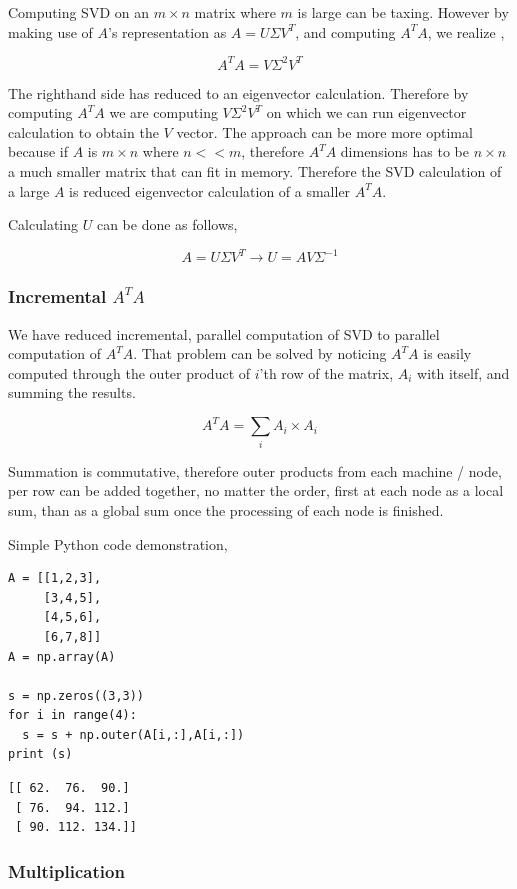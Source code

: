 \documentclass{article}
\begin{document}
Computing SVD on an $m \times n$ matrix where $m$ is large can be
taxing. However by making use of $A$'s representation as $A = U \Sigma V^T$, and
computing $A^TA$, we realize \cite{zadeh},

$$
A^TA = V \Sigma^2 V^T 
$$

The righthand side has reduced to an eigenvector calculation. Therefore by
computing $A^TA$ we are computing $V \Sigma^2 V^T $ on which we can run
eigenvector calculation to obtain the $V$ vector. The approach can be more more
optimal because if $A$ is $m \times n$ where $n << m$, therefore $A^TA$
dimensions has to be $n \times n$ a much smaller matrix that can fit in memory.
Therefore the SVD calculation of a large $A$ is reduced eigenvector calculation
of a smaller $A^TA$.

Calculating $U$ can be done as follows,

$$
A = U \Sigma V^T \to U = A V \Sigma^{-1}
$$

\subsubsection{Incremental $A^T A$}

We have reduced incremental, parallel computation of SVD to parallel computation
of $A^T A$. That problem can be solved by noticing $A^T A$ is easily computed
through the outer product of $i$'th row of the matrix, $A_{i}$ with itself, and
summing the results.

$$
A^T A = \sum_{i} A_i \times A_i
$$

Summation is commutative, therefore outer products from each machine / node, per
row can be added together, no matter the order, first at each node as a
local sum, than as a global sum once the processing of each node is finished.

Simple Python code demonstration,

\begin{verbatim}
A = [[1,2,3],
     [3,4,5],
     [4,5,6],
     [6,7,8]]
A = np.array(A)

s = np.zeros((3,3))
for i in range(4):
  s = s + np.outer(A[i,:],A[i,:])
print (s)    
\end{verbatim}

\begin{verbatim}
[[ 62.  76.  90.]
 [ 76.  94. 112.]
 [ 90. 112. 134.]]
\end{verbatim}

\subsubsection{Multiplication}
\end{document}
